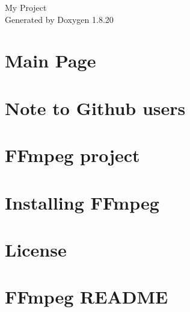\let\mypdfximage\pdfximage\def\pdfximage{\immediate\mypdfximage}\documentclass[twoside]{book}
\newcommand{\+}{\discretionary{\mbox{\scriptsize$\hookleftarrow$}}{}{}}
\newcommand{\clearemptydoublepage}{%
  \newpage{\pagestyle{empty}\cleardoublepage}%
}
\begin{document}
\hypersetup{pageanchor=false,
             bookmarksnumbered=true,
             pdfencoding=unicode
            }
\begin{titlepage}
\vspace*{7cm}
\begin{center}%
{\Large My Project }\\
\vspace*{1cm}
{\large Generated by Doxygen 1.8.20}\\
\end{center}
\end{titlepage}
\clearemptydoublepage
{}
\tableofcontents
\clearemptydoublepage
{}
\hypersetup{pageanchor=true}

\chapter{Main Page}
\label{index}\hypertarget{index}{}
\chapter{Note to Github users}
\label{md__e__github_ffmpeg__c_o_n_t_r_i_b_u_t_i_n_g}

\chapter{F\+Fmpeg project}
\label{md__e__github_ffmpeg_doc_dev_community_community}

\chapter{Installing F\+Fmpeg}
\label{md__e__github_ffmpeg__i_n_s_t_a_l_l}

\chapter{License}
\label{md__e__github_ffmpeg__l_i_c_e_n_s_e}

\chapter{F\+Fmpeg R\+E\+A\+D\+ME}
\label{md__e__github_ffmpeg__r_e_a_d_m_e}

\end{document}
